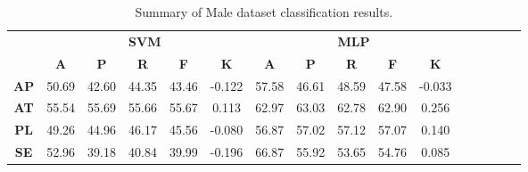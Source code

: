 \begin{landscape}
\begin{table}[htbp]
\footnotesize
\centering
\caption{Summary of Male dataset classification results.}
\label{tab:base_female}
\begin{tabular}{|c|c|c|c|c|c|c|c|c|c|c|c|c|c|c|c|}
\hline
\multirow{2}{*}{}	& \multicolumn{5}{c|}{\textbf{SVM}}												& \multicolumn{5}{c|}{\textbf{MLP}}												\\ \cline{2-11} 
					& \textbf{A}	& \textbf{P}	& \textbf{R}	& \textbf{F}	& \textbf{K}	& \textbf{A}	& \textbf{P}	& \textbf{R}	& \textbf{F}	& \textbf{K}	\\ \hline
\textbf{AP}			& 50.69			& 42.60			& 44.35			& 43.46			& -0.122			& 57.58			& 46.61			& 48.59			& 47.58			& -0.033			\\ \hline
\textbf{AT}			& 55.54			& 55.69			& 55.66			& 55.67			& 0.113			& 62.97			& 63.03			& 62.78			& 62.90			& 0.256			\\ \hline
\textbf{PL}			& 49.26			& 44.96			& 46.17			& 45.56			& -0.080			& 56.87			& 57.02			& 57.12			& 57.07			& 0.140			\\ \hline
\textbf{SE}			& 52.96			& 39.18			& 40.84			& 39.99			& -0.196			& 66.87			& 55.92			& 53.65			& 54.76			& 0.085			\\ \hline
\end{tabular}
\end{table}
\end{landscape}
